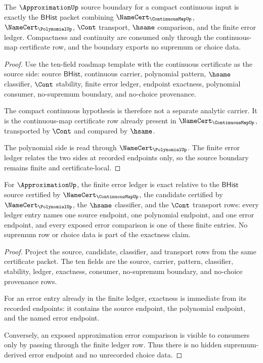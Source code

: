 \begin{theorem}
\label{thm:approximation-compact-continuous-source-boundary}
The $\ApproximationUp$ source boundary for a compact continuous input is exactly
the $\mathsf{BHist}$ packet combining $\NameCert_{\ContinuousMapUp}$,
$\NameCert_{\PolynomialUp}$, $\Cont$ transport, $\hsame$ comparison, and the
finite error ledger. Compactness and continuity are consumed only through the
continuous-map certificate row, and the boundary exports no supremum or choice
data.
\end{theorem}
\begin{proof}
Use the ten-field roadmap template with the continuous certificate as the source
side: source $\mathsf{BHist}$, continuous carrier, polynomial pattern,
$\hsame$ classifier, $\Cont$ stability, finite error ledger, endpoint exactness,
polynomial consumer, no-supremum boundary, and no-choice provenance.

The compact continuous hypothesis is therefore not a separate analytic carrier.
It is the continuous-map certificate row already present in
$\NameCert_{\ContinuousMapUp}$, transported by $\Cont$ and compared by $\hsame$.

The polynomial side is read through $\NameCert_{\PolynomialUp}$. The finite
error ledger relates the two sides at recorded endpoints only, so the source
boundary remains finite and certificate-local.
\end{proof}

\begin{theorem}
\label{thm:approximation-error-ledger-exactness}
For $\ApproximationUp$, the finite error ledger is exact relative to the
$\mathsf{BHist}$ source certified by $\NameCert_{\ContinuousMapUp}$, the
candidate certified by $\NameCert_{\PolynomialUp}$, the $\hsame$ classifier,
and the $\Cont$ transport rows: every ledger entry names one source endpoint,
one polynomial endpoint, and one error endpoint, and every exposed error
comparison is one of these finite entries. No supremum row or choice data is
part of the exactness claim.
\end{theorem}
\begin{proof}
Project the source, candidate, classifier, and transport rows from the same
certificate packet. The ten fields are the source, carrier, pattern,
classifier, stability, ledger, exactness, consumer, no-supremum boundary, and
no-choice provenance rows.

For an error entry already in the finite ledger, exactness is immediate from
its recorded endpoints: it contains the source endpoint, the polynomial
endpoint, and the named error endpoint.

Conversely, an exposed approximation error comparison is visible to consumers
only by passing through the finite ledger row. Thus there is no hidden
supremum-derived error endpoint and no unrecorded choice data.
\end{proof}

